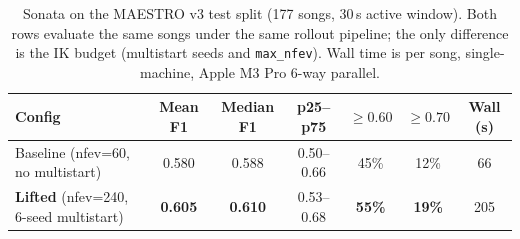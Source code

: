 %


\begin{table}[t]
\centering
\caption{Sonata on the MAESTRO v3 test split (177 songs, 30\,s active window).
Both rows evaluate the same songs under the same rollout pipeline; the only
difference is the IK budget (multistart seeds and \texttt{max\_nfev}). Wall
time is per song, single-machine, Apple M3 Pro 6-way parallel.}
\label{tab:main_177}
\begin{tabular}{lcccccc}
\toprule
Config & Mean F1 & Median F1 & p25--p75 & $\geq 0.60$ & $\geq 0.70$ & Wall (s) \\
\midrule
Baseline (nfev=60, no multistart)            & 0.580 & 0.588 & 0.50--0.66 & 45\% & 12\% & 66 \\
\textbf{Lifted} (nfev=240, 6-seed multistart) & \textbf{0.605} & \textbf{0.610} & 0.53--0.68 & \textbf{55\%} & \textbf{19\%} & 205 \\
\bottomrule
\end{tabular}
\end{table}


